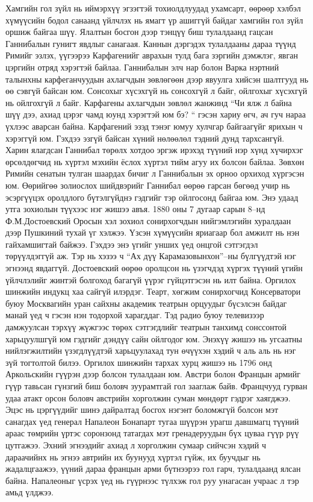 Хамгийн гол зүйл нь иймэрхүү эгзэгтэй тохиолдлуудад ухамсарт, өөрөөр хэлбэл хүмүүсийн бодол санаанд үйлчлэх нь ямагт үр ашиггүй байдаг хамгийн гол зүйл оршиж байгаа шүү. Ялалтын босгон дээр тэнцүү биш тулалдаанд гацсан Ганнибалын гунигт явдлыг санагаая. Каннын дэргэдэх тулалдааны дараа түүнд Римийг эзлэх, үүгээрээ Карфагенийг аврахын тулд бага зэргийн дэмжлэг, явган цэргийн отряд хэрэгтэй байлаа. Ганнибалын элч нар болон Варка нэртний талынхны карфеганчуудын ахлагчдын зөвлөгөөн дээр явуулга хийсэн шалтгууд нь өө сэвгүй байсан юм. Сонсохыг хүсэхгүй нь сонсохгүй л байг, ойлгохыг хүсэхгүй нь ойлгохгүй л байг. Карфагены ахлагчдын зөвлөл жанжинд “Чи ялж л байна шүү дээ, ахиад цэрэг чамд юунд хэрэгтэй юм бэ? “ гэсэн хариу өгч, ач гуч нараа үхлээс аварсан байна. Карфагений эзэд тэнэг юмуу хулчгар байгаагүйг ярихын ч хэрэггүй юм. Гэхдээ эзгүй байсан хүний нөлөөлөл тэдний дунд тархсангүй. Харин ялагдсан Ганнибал төрөлх хотдоо эргэж ирэхэд түүний нэр хүнд хүчирхэг өрсөлдөгчид нь хүртэл мэхийн ёслох хүртэл тийм агуу их болсон байлаа. Зөвхөн Римийн сенатын тулган шаардах бичиг л Ганнибалын эх орноо орхиход хүргэсэн юм. Өөрийгөө золиослох шийдвэрийг Ганнибал өөрөө гарсан бөгөөд учир нь эсэргүүцэх оролдлого бүтэлгүйднэ гэдгийг тэр ойлгосонд байгаа юм.
Энэ удаад утга зохиолын түүхээс нэг жишээ авъя. 1880 оны 7 дугаар сарын 8–нд Ф.М.Достоевский Оросын хэл зохиол сонирхогчдын нийгэмлэгийн хуралдаан дээр Пушкиний тухай үг хэлжээ. Үзсэн хүмүүсийн яриагаар бол амжилт нь нэн гайхамшигтай байжээ. Гэхдээ энэ үгийг унших үед онцгой сэтгэгдэл төрүүлдэггүй аж. Тэр нь хэзээ ч “Ах дүү Карамазовынхон”–ны бүлгүүдтэй нэг эгнээнд явдаггүй. Достоевский өөрөө оролцсон нь үзэгчдэд хүргэх түүний үгийн үйлчлэлийг жинтэй болгоход багагүй үүрэг гүйцэтгэсэн нь илт байна.
Оргилох шинжийн индукц хаа сайгүй илэрдэг. Теарт, хөгжим сонирхогчид Консерватори буюу Москвагийн уран сайхны академик театрын орцуудыг бүсэлсэн байдаг манай үед ч гэсэн нэн тодорхой харагддаг. Тэд радио буюу телевизээр дамжуулсан тэрхүү жүжгээс төрөх сэтгэгдлийг театрын танхимд сонссонтой харьцуулшгүй юм гэдгийг дэндүү сайн ойлгодог юм. Энэхүү жишээ нь угсаатны нийлэгжилтийн үзэгдлүүдтэй харьцуулахад тун өчүүхэн хэдий ч аль аль нь нэг зүй тогтолтой билээ.
Оргилох шинжийн тархах хурц жишээ нь 1796 онд Аркольскийн гүүрэн дээр болсон тулалдаан юм. Австри болон Францын армийг гүүр тавьсан гүнзгий биш боловч зуурамтгай гол зааглаж байв. Францчууд гурван удаа атакт орсон боловч австрийн хорголжин суман мөндөрт гэдрэг хаягджээ. Эцэс нь цэргүүдийг шинэ дайралтад босгох нэгэнт боломжгүй болсон мэт санагдах үед генерал Напалеон Бонапарт тугаа шүүрэн урагш давшмагц түүний араас төмрийн үртэс соронзонд татагдах мэт гренадеруудын бүх цуваа гүүр рүү цутгажээ. Эхний эгнээдийг ахиад л хорголжин сумаар сийчсэн хэдий ч дараачийнх нь эгнээ автрийн их буунууд хүртэл гүйж, их буучдыг нь жадалцгаажээ, үүний дараа францын арми бүтнээрээ гол гарч, тулалдаанд ялсан байна. Напалеоныг үсрэх үед нь гүүрнээс түлхэж гол руу унагасан учраас л тэр амьд үлджээ.

